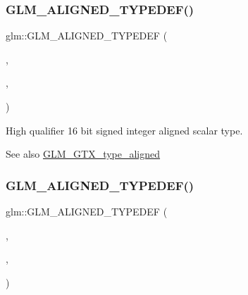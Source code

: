 \subsubsection{\texorpdfstring{G\+L\+M\+\_\+\+A\+L\+I\+G\+N\+E\+D\+\_\+\+T\+Y\+P\+E\+D\+E\+F()}{GLM\_ALIGNED\_TYPEDEF()}\hspace{0.1cm}{\footnotesize\ttfamily [34/209]}}
{\footnotesize\ttfamily glm\+::\+G\+L\+M\+\_\+\+A\+L\+I\+G\+N\+E\+D\+\_\+\+T\+Y\+P\+E\+D\+EF (\begin{DoxyParamCaption}\item[{\hyperlink{group__gtc__type__precision_gaa04399853952dbce29cb62e2432f350a}{highp\+\_\+i16}}]{,  }\item[{aligned\+\_\+highp\+\_\+i16}]{,  }\item[{2}]{ }\end{DoxyParamCaption})}

High qualifier 16 bit signed integer aligned scalar type. \begin{DoxySeeAlso}{See also}
\hyperlink{group__gtx__type__aligned}{G\+L\+M\+\_\+\+G\+T\+X\+\_\+type\+\_\+aligned} 
\end{DoxySeeAlso}
\mbox{\label{group__gtx__type__aligned_ga9c8172b745ee03fc5b2b91c350c2922f}} 
\subsubsection{\texorpdfstring{G\+L\+M\+\_\+\+A\+L\+I\+G\+N\+E\+D\+\_\+\+T\+Y\+P\+E\+D\+E\+F()}{GLM\_ALIGNED\_TYPEDEF()}\hspace{0.1cm}{\footnotesize\ttfamily [35/209]}}
{\footnotesize\ttfamily glm\+::\+G\+L\+M\+\_\+\+A\+L\+I\+G\+N\+E\+D\+\_\+\+T\+Y\+P\+E\+D\+EF (\begin{DoxyParamCaption}\item[{\hyperlink{group__gtc__type__precision_ga197d19b585222da57d70238a5cfc2be8}{highp\+\_\+i32}}]{,  }\item[{aligned\+\_\+highp\+\_\+i32}]{,  }\item[{4}]{ }\end{DoxyParamCaption})}

